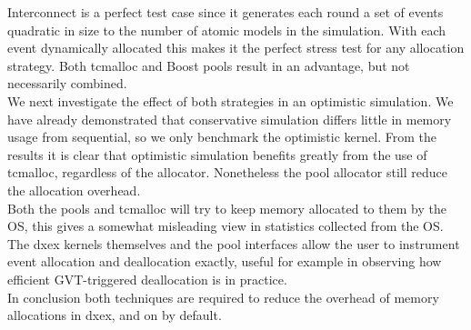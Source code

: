 Interconnect is a perfect test case since it generates each round a set of events quadratic in size to the number of atomic models in the simulation. With each event dynamically allocated this makes it the perfect stress test for any allocation strategy. Both tcmalloc and Boost pools result in an advantage, but not necessarily combined. \\
We next investigate the effect of both strategies in an optimistic simulation. We have already demonstrated that conservative simulation differs little in memory usage from sequential, so we only benchmark the optimistic kernel. From the results it is clear that optimistic simulation benefits greatly from the use of tcmalloc, regardless of the allocator. Nonetheless the pool allocator still reduce the allocation overhead. \\
Both the pools and tcmalloc will try to keep memory allocated to them by the OS, this gives a somewhat misleading view in statistics collected from the OS. The dxex kernels themselves and the pool interfaces allow the user to instrument event allocation and deallocation exactly, useful for example in observing how efficient GVT-triggered deallocation is in practice.\\
In conclusion both techniques are required to reduce the overhead of memory allocations in dxex, and on by default. 

